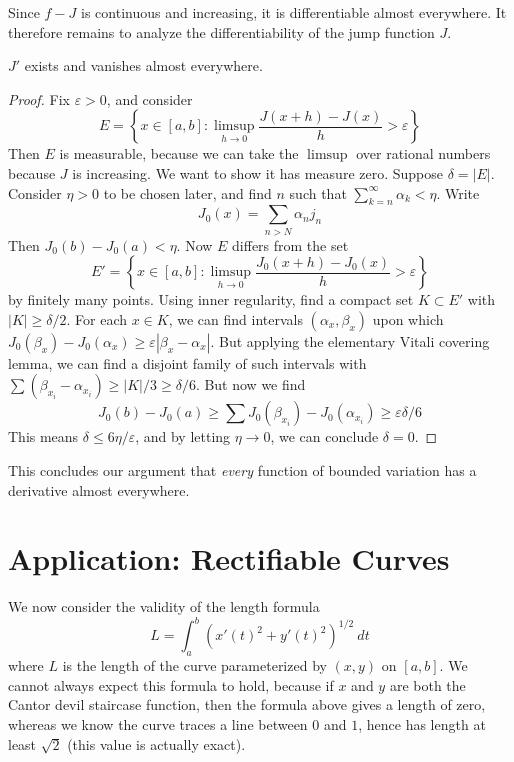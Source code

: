 Since $f - J$ is continuous and increasing, it is differentiable almost everywhere. It therefore remains to analyze the differentiability of the jump function $J$.

\begin{theorem}
    $J'$ exists and vanishes almost everywhere.
\end{theorem}
\begin{proof}
    Fix $\varepsilon > 0$, and consider
    \[ E = \left\{ x \in [a,b]: \limsup_{h \to 0} \frac{J(x + h) - J(x)}{h} > \varepsilon \right\} \]
    Then $E$ is measurable, because we can take the $\limsup$ over rational numbers because $J$ is increasing. We want to show it has measure zero. Suppose $\delta = |E|$. Consider $\eta > 0$ to be chosen later, and find $n$ such that $\sum_{k = n}^\infty \alpha_k < \eta$. Write
    \[ J_0(x) = \sum_{n > N} \alpha_n j_n \]
    Then $J_0(b) - J_0(a) < \eta$. Now $E$ differs from the set
    \[ E' = \left\{ x \in [a,b]: \limsup_{h \to 0} \frac{J_0(x + h) - J_0(x)}{h} > \varepsilon \right\} \]
    by finitely many points. Using inner regularity, find a compact set $K \subset E'$ with $|K| \geq \delta/2$. For each $x \in K$, we can find intervals $(\alpha_x, \beta_x)$ upon which $J_0(\beta_x) - J_0(\alpha_x) \geq \varepsilon |\beta_x - \alpha_x|$. But applying the elementary Vitali covering lemma, we can find a disjoint family of such intervals with $\sum (\beta_{x_i} - \alpha_{x_i}) \geq |K|/3 \geq \delta/6$. But now we find
    \[ J_0(b) - J_0(a) \geq \sum J_0(\beta_{x_i}) - J_0(\alpha_{x_i}) \geq \varepsilon \delta/6 \]
    This means $\delta \leq 6 \eta/\varepsilon$, and by letting $\eta \to 0$, we can conclude $\delta = 0$.
\end{proof}

This concludes our argument that {\it every} function of bounded variation has a derivative almost everywhere.

\section{Application: Rectifiable Curves}

We now consider the validity of the length formula
%
\[ L = \int_a^b (x'(t)^2 + y'(t)^2)^{1/2}\ dt \]
%
where $L$ is the length of the curve parameterized by $(x,y)$ on $[a,b]$. We cannot always expect this formula to hold, because if $x$ and $y$ are both the Cantor devil staircase function, then the formula above gives a length of zero, whereas we know the curve traces a line between $0$ and $1$, hence has length at least $\sqrt{2}$ (this value is actually exact).


